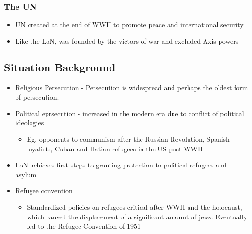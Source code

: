 \documentclass[11pt]{article}
\begin{document}
\subsubsection{The UN}
\label{sec:orgffe480d}
\begin{itemize}
\item UN created at the end of WWII to promote peace and international security
\item Like the LoN, was founded by the victors of war and excluded Axis powers
\end{itemize}
\subsection{Situation Background}
\label{sec:org5ce7c3f}
\begin{itemize}
\item Religious Persecution - Persecution is widespread and perhaps the oldest form of persecution.
\item Political eprsecution - increased in the modern era due to conflict of political ideologies
\begin{itemize}
\item Eg. opponents to communism after the Russian Revolution, Spanish loyalists, Cuban and Hatian refugees in the US post-WWII
\end{itemize}
\item LoN achieves first steps to granting protection to political refugees and asylum
\item Refugee convention
\begin{itemize}
\item Standardized policies on refugees critical after WWII and the holocaust, which caused the displacement of a significant amount of jews. Eventually led to the Refugee Convention of 1951
\end{itemize}
\end{itemize}
\end{document}
